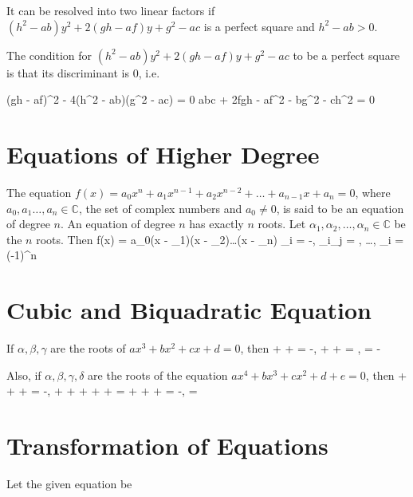It can be resolved into two linear factors if $(h^2 - ab)y^2 + 2(gh - af)y + g^2 - ac$ is a perfect square and $h^2 - ab > 0$.

The condition for $(h^2 - ab)y^2 + 2(gh - af)y + g^2 - ac$ to be a perfect square is that its discriminant is $0$, i.e.

(gh - af)^2 - 4(h^2 - ab)(g^2 - ac) = 0\stopformula
\startformula \Rightarrow abc + 2fgh - af^2 - bg^2 - ch^2 = 0\stopformula

\section{Equations of Higher Degree}
The equation $f(x) = a_0x^n + a_1x^{n - 1} + a_2x^{n - 2} + \ldots + a_{n - 1}x + a_n = 0$, where $a_0, a_1 \ldots,
a_n\in\mathbb{C}$, the set of complex numbers and $a_0\neq 0$, is said to be an equation of degree $n$. An equation of degree $n$
has exactly $n$ roots. Let $\alpha_1, \alpha_2, \ldots, \alpha_n\in\mathbb{C}$ be the $n$ roots. Then
\startformula f(x) = a_0(x - \alpha_1)(x - \alpha_2)\ldots(x - \alpha_n)\stopformula
\startformula \sum\alpha_i = -, \sum\alpha_i\alpha_j = , \ldots, \prod\alpha_i = (-1)^n\stopformula

\section{Cubic and Biquadratic Equation}
If $\alpha, \beta, \gamma$ are the roots of $ax^3 + bx^2 + cx + d = 0$, then
\startformula \alpha + \beta + \gamma = -, \alpha\beta + \beta\gamma + \gamma\alpha = , \alpha\beta\gamma =
-\stopformula

Also, if $\alpha, \beta, \gamma, \delta$ are the roots of the equation $ax^4 + bx^3 + cx^2 + d + e = 0$, then
\startformula \alpha + \beta + \gamma + \delta = -, \alpha\beta + \alpha\gamma + \alpha\delta + \beta\gamma + \beta\delta +
\gamma\delta = \stopformula
\startformula \alpha\beta\gamma + \alpha\beta\delta + \alpha\gamma\delta + \beta\gamma\delta = -, \alpha\beta\gamma\delta =
\stopformula


\section{Transformation of Equations}
Let the given equation be

